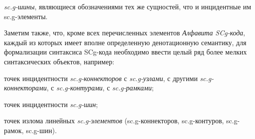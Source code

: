 \begin{SCn}
\begin{scnstruct}
\begin{scnsubstruct}
{\begin{scnitemize}
            \item \textit{sc.g-шины}, являющиеся обозначениями тех же сущностей, что и инцидентные им sc.g-элементы.
            \end{scnitemize}
            Заметим также, что, кроме всех перечисленных элементов \textit{Алфавита SCg-кода}, каждый из которых имеет вполне определенную денотационную  семантику, для формализации синтаксиса SCg-кода необходимо ввести целый ряд более мелких синтаксических объектов, например:
            \begin{scnitemize}
            \item точек инцидентности \textit{sc.g-коннекторов} с \textit{sc.g-узлами}, с другими \textit{sc.g-коннекторами}, с \textit{sc.g-контурами}, с \textit{sc.g-рамками}; 
            \item точек инцидентности \textit{sc.g-шин};
            \item точек излома линейных \textit{sc.g-элементов} (sc.g-коннекторов, sc.g-контуров, sc.g-рамок, sc.g-шин).
            \end{scnitemize}
            }
            
            \begin{scnhaselementset}
                \scnitem{\scnnonamednode}
                \begin{scnindent}
                    \begin{scneqtoset}
                    \end{scneqtoset}
                \end{scnindent}
                \scnitem{\scnnonamednode}
                    \begin{scnindent}
                        \begin{scneqtoset}
                    \end{scneqtoset}
                \end{scnindent}
                \scnitem{\scnnonamednode}
                    \begin{scnindent}
                        \begin{scneqtoset}
                    \end{scneqtoset}
                \end{scnindent}
            \end{scnhaselementset}
            \begin{scnindent}
            \end{scnindent}
                

\end{scnsubstruct}
\end{scnstruct}
\end{SCn}
